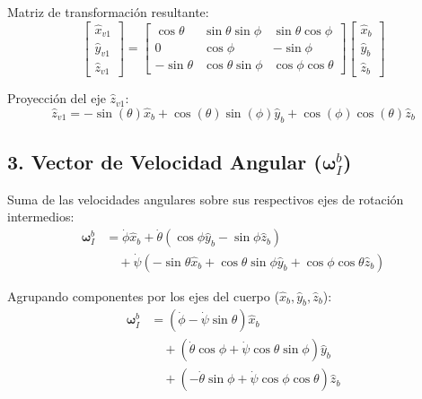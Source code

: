 \documentclass[11pt,a4paper]{article}
\begin{document}
Matriz de transformación resultante:
\begin{equation}
\begin{bmatrix}
\hat{x}_{v1} \\
\hat{y}_{v1} \\
\hat{z}_{v1}
\end{bmatrix}
=
\begin{bmatrix}
\cos\theta & \sin\theta\sin\phi & \sin\theta\cos\phi \\
0 & \cos\phi & -\sin\phi \\
-\sin\theta & \cos\theta\sin\phi & \cos\phi\cos\theta
\end{bmatrix}
\begin{bmatrix}
\hat{x}_b \\
\hat{y}_b \\
\hat{z}_b
\end{bmatrix}
\end{equation}

Proyección del eje $\hat{z}_{v1}$:
\begin{equation}
\hat{z}_{v1} = -\sin(\theta)\hat{x}_b + \cos(\theta)\sin(\phi)\hat{y}_b + \cos(\phi)\cos(\theta)\hat{z}_b
\end{equation}

\vspace{0.3cm}

\subsection*{3. Vector de Velocidad Angular ($\boldsymbol{\omega}_{I}^b$)}

Suma de las velocidades angulares sobre sus respectivos ejes de rotación intermedios:
\begin{equation}
\begin{aligned}
\bm{\omega}_{I}^b &= \dot{\phi} \hat{x}_b 
+ \dot{\theta} \left( \cos\phi \hat{y}_b - \sin\phi \hat{z}_b \right) \\
&\quad + \dot{\psi} \left( -\sin\theta \hat{x}_b + \cos\theta\sin\phi \hat{y}_b + \cos\phi\cos\theta \hat{z}_b \right)
\end{aligned}
\end{equation}

Agrupando componentes por los ejes del cuerpo ($\hat{x}_b, \hat{y}_b, \hat{z}_b$):
\begin{equation}
\begin{aligned}
\bm{\omega}_{I}^b &= \left( \dot{\phi} - \dot{\psi}\sin\theta \right) \hat{x}_b \\
&\quad + \left( \dot{\theta}\cos\phi + \dot{\psi}\cos\theta\sin\phi \right) \hat{y}_b \\
&\quad + \left( -\dot{\theta}\sin\phi + \dot{\psi}\cos\phi\cos\theta \right) \hat{z}_b
\end{aligned}
\end{equation}
\end{document}
